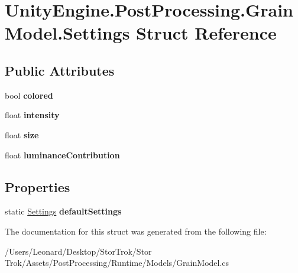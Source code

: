 \hypertarget{struct_unity_engine_1_1_post_processing_1_1_grain_model_1_1_settings}{}\section{Unity\+Engine.\+Post\+Processing.\+Grain\+Model.\+Settings Struct Reference}
\label{struct_unity_engine_1_1_post_processing_1_1_grain_model_1_1_settings}
\subsection*{Public Attributes}
\begin{DoxyCompactItemize}
\item 
\mbox{\label{struct_unity_engine_1_1_post_processing_1_1_grain_model_1_1_settings_aad04a9e0e2a4e76a4d039aef0b510dd7}} 
bool {\bfseries colored}
\item 
\mbox{\label{struct_unity_engine_1_1_post_processing_1_1_grain_model_1_1_settings_ae696f9b4163df03b17d1f1d824ece3e2}} 
float {\bfseries intensity}
\item 
\mbox{\label{struct_unity_engine_1_1_post_processing_1_1_grain_model_1_1_settings_a781cd0e3020f79f79b17e17ebb2bca57}} 
float {\bfseries size}
\item 
\mbox{\label{struct_unity_engine_1_1_post_processing_1_1_grain_model_1_1_settings_ac063b9210d784f1f79192e23a945cfed}} 
float {\bfseries luminance\+Contribution}
\end{DoxyCompactItemize}
\subsection*{Properties}
\begin{DoxyCompactItemize}
\item 
\mbox{\label{struct_unity_engine_1_1_post_processing_1_1_grain_model_1_1_settings_a8df6cd9a36238511c92646fe1b9e86bc}} 
static \hyperlink{struct_unity_engine_1_1_post_processing_1_1_grain_model_1_1_settings}{Settings} {\bfseries default\+Settings}
\end{DoxyCompactItemize}


The documentation for this struct was generated from the following file\+:\begin{DoxyCompactItemize}
\item 
/\+Users/\+Leonard/\+Desktop/\+Stor\+Trok/\+Stor Trok/\+Assets/\+Post\+Processing/\+Runtime/\+Models/Grain\+Model.\+cs\end{DoxyCompactItemize}
